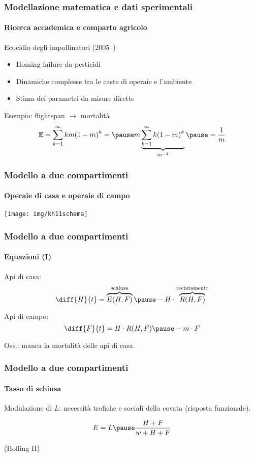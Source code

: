 \documentclass[]{beamer} %
\begin{document}
\begin{frame}
    \frametitle{Modellazione matematica e dati sperimentali}
    \framesubtitle{Ricerca accademica e comparto agricolo}

    Ecocidio degli impollinatori (2005--)

    \begin{itemize}
        \item Homing failure da pesticidi
        \item \pause Dinamiche complesse tra le caste di operaie e l'ambiente
        \item \pause Stima dei parametri da misure dirette
    \end{itemize}

    \pause
    Esempio: flightspan $\to$ mortalità \pause
    $$ \mathbb{E} = \sum_{k=1}^{\infty} k m {(1-m)}^k = \pause
    m \underbrace{ \sum_{k=1}^{\infty} k {(1-m)}^k }_{m^{-2}}
    \pause = \frac{1}{m}$$
\end{frame}




\begin{frame}
    \frametitle{Modello a due compartimenti}
    \framesubtitle{Operaie di casa e operaie di campo}

    \cite{khoury2011}

    \pause
    \begin{center}
        \texttt{[image: img/kh11schema]}
    \end{center}
\end{frame}

\begin{frame}
    \frametitle{Modello a due compartimenti}
    \framesubtitle{Equazioni (I)}

    Api di casa:
    $$\diff{H}{t} = \overbrace{ E(H,F) }^{\text{schiusa}} \pause - H \cdot \overbrace{ R(H,F) }^{\text{reclutamento}} $$

    \pause
    Api di campo:
    $$\diff{F}{t} = H \cdot R(H,F)  \pause - m \cdot F $$

    \pause
    Oss.: manca la mortalità delle api di casa.
\end{frame}


\begin{frame}
    \frametitle{Modello a due compartimenti}
    \framesubtitle{Tasso di schiusa}

    Modulazione di $L$: necessità trofiche e sociali della covata (risposta funzionale).

    $$E = L \pause \frac{H+F}{w+H+F}$$

    (Holling II)

\end{frame}
\end{document}
